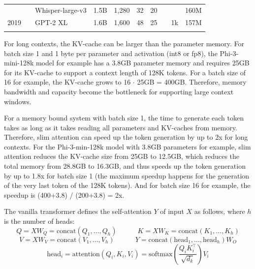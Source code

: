 \documentclass{article}
\def\fline{\Xhline{2\arrayrulewidth}} %
\begin{document}
\begin{table}[h!]
\begin{tabular}{lllccccccc}
         &                      & Whisper-large-v3      & 1.5B  & 1,280         & 32         & 20         &             &              & 160M  \\ \cline{1-1} \cline{9-9} %
  2019   &                      & GPT-2 XL              & 1.6B  & 1,600         & 48         & 25         &             & 1k           & 157M  \\ \fline
\end{tabular} \label{tab1} \end{table} \endgroup
For long contexts, the KV-cache can be larger than the parameter memory. For batch size 1 and 1 byte per parameter and activation (int8 or fp8), the Phi-3-mini-128k model for example has a 3.8GB parameter memory and requires 25GB for its KV-cache to support a context length of 128K tokens. For a batch size of 16 for example, the KV-cache grows to 16 $\cdot$ 25GB = 400GB. Therefore, memory bandwidth and capacity become the bottleneck for supporting large context windows.

For a memory bound system with batch size 1, the time to generate each token takes as long as it takes reading all parameters and KV-caches from memory. Therefore, slim attention can speed up the token generation by up to 2x for long contexts. For the Phi-3-min-128k model with 3.8GB parameters for example, slim attention reduces the KV-cache size from 25GB to 12.5GB, which reduces the total memory from 28.8GB to 16.3GB, and thus speeds up the token generation by up to 1.8x for batch size 1 (the maximum speedup happens for the generation of the very last token of the 128K tokens). And for batch size 16 for example, the speedup is (400+3.8) / (200+3.8) = 2x.

The vanilla transformer \citep{vanilla} defines the self-attention $Y$ of input $X$ as follows, where $h$ is the number of heads:
\begin{equation}
  Q = X W_Q = \text{concat} \left( Q_1, \ldots, Q_h \right) \qquad \quad K = X W_K = \text{concat} \left( K_1, \ldots, K_h \right) \label{eq4}
\end{equation}
\begin{equation}
  V = X W_V = \text{concat} \left( V_1, \ldots, V_h \right) \qquad \quad Y = \text{concat} \left( \text{head}_1, \ldots, \text{head}_h \right) W_O  \label{eq5}
\end{equation}
\begin{equation}
  \text{head}_i = \text{attention} \left( Q_i, K_i, V_i \right) = \text{softmax} \left( \frac{Q_i K_i^\top}{\sqrt{d_k}} \right) V_i \label{eq2}
\end{equation}
\end{document}

